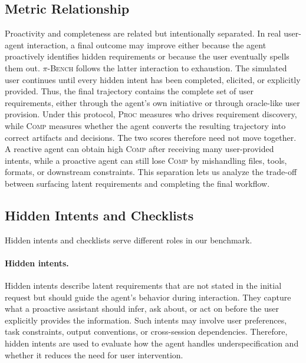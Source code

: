 \documentclass{llmxive}
\providecommand{\bench}{\textsc{$\pi$-Bench}}
\begin{document}
\subsection{Metric Relationship}
\label{app:metric_relationship}
Proactivity and completeness are related but intentionally separated. In real user-agent interaction, a final outcome may improve either because the agent proactively identifies hidden requirements or because the user eventually spells them out. {\bench} follows the latter interaction to exhaustion. The simulated user continues until every hidden intent has been completed, elicited, or explicitly provided. Thus, the final trajectory contains the complete set of user requirements, either through the agent's own initiative or through oracle-like user provision. Under this protocol, \textsc{Proc} measures who drives requirement discovery, while \textsc{Comp} measures whether the agent converts the resulting trajectory into correct artifacts and decisions. The two scores therefore need not move together. A reactive agent can obtain high \textsc{Comp} after receiving many user-provided intents, while a proactive agent can still lose \textsc{Comp} by mishandling files, tools, formats, or downstream constraints. This separation lets us analyze the trade-off between surfacing latent requirements and completing the final workflow.

\subsection{Hidden Intents and Checklists}
\label{app:hidden_intents_checklists}

Hidden intents and checklists serve different roles in our benchmark.

\paragraph{Hidden intents.} Hidden intents describe latent requirements that are not stated in the initial request but should guide the agent's behavior during interaction. They capture what a proactive assistant should infer, ask about, or act on before the user explicitly provides the information. Such intents may involve user preferences, task constraints, output conventions, or cross-session dependencies. Therefore, hidden intents are used to evaluate how the agent handles underspecification and whether it reduces the need for user intervention.
\end{document}
